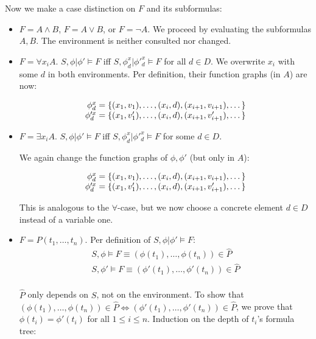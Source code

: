 \noindent
Now we make a case distinction on $F$ and its subformulas:
\begin{itemize}
	\item $F = A \wedge B$, $F = A \vee B$, or $F = \neg A$. We proceed by evaluating the subformulas $A, B$. The environment is neither consulted nor changed.
	
	\item $F = \forall x_i A$. $S, \phi|\phi' \models F$ iff $S,\phi^x_d|\phi'^x_d \models F$ for all $d \in D$. We overwrite $x_i$ with some $d$ in both environments. Per definition, their function graphs (in $A$) are now:
	
	$$
		\begin{array}{r l }
			\phi^x_d = \{ (x_1,v_1),\dots,(x_i,d),(x_{i+1},v_{i+1}),\dots \}\\
			\phi'^x_d = \{ (x_1,v_1'),\dots,(x_i,d),(x_{i+1},v_{i+1}'),\dots \}
		\end{array}
	$$
	
	\item $F = \exists x_i A$. $S, \phi|\phi' \models F$ iff $S,\phi^x_d|\phi'^x_d \models F$ for some $d \in D$.
	
	We again change the function graphs of $\phi, \phi'$ (but only in $A$):
	
	$$
		\begin{array}{r l }
			\phi^x_d = \{ (x_1,v_1),\dots,(x_i,d),(x_{i+1},v_{i+1}),\dots \}\\
			\phi'^x_d = \{ (x_1,v_1'),\dots,(x_i,d),(x_{i+1},v_{i+1}'),\dots \}
		\end{array}
	$$
	
	This is analogous to the $\forall$-case, but we now choose a concrete element $d \in D$ instead of a variable one.
	
	\item $F = P(t_1,\dots,t_n)$. Per definition of $S, \phi|\phi' \models F$:
		$$
			\begin{array}{l}
				S, \phi \models F \equiv (\phi(t_1),\dots,\phi(t_n)) \in \hat{P}\\
				S, \phi' \models F \equiv (\phi'(t_1),\dots,\phi'(t_n)) \in \hat{P}\\
			\end{array}
		$$
		
		$\hat{P}$ only depends on $S$, not on the environment. To show that $(\phi(t_1),\dots,\phi(t_n)) \in \hat{P} \Leftrightarrow (\phi'(t_1),\dots,\phi'(t_n)) \in \hat{P}$, we prove that $\phi(t_i) = \phi'(t_i)$ for all $1 \leq i \leq n$. Induction on the depth of $t_i$'s formula tree:
		

\end{itemize}
